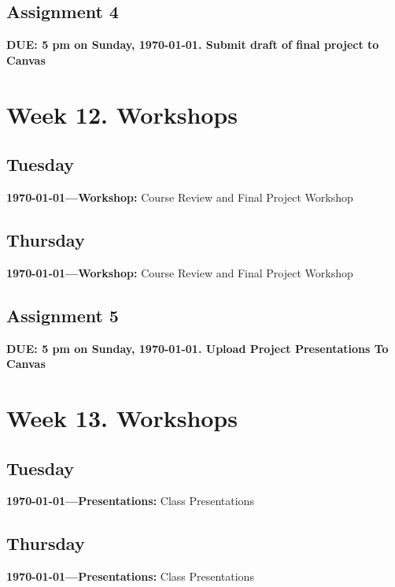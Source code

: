 \vspace{2em}
\subsection{Assignment 4} \textbf{DUE: 5 pm on Sunday, \today. Submit draft of final project to Canvas}

\AdvanceDate[2]


\vspace{2em}


\section{Week 12. Workshops }


\subsection{Tuesday} \textbf{\today---Workshop:} Course Review and Final Project Workshop
\AdvanceDate[2]

\subsection{Thursday } \textbf{\today---Workshop:} Course Review and Final Project Workshop

\AdvanceDate[3]

\vspace{2em}



\subsection{Assignment 5} \textbf{DUE: 5 pm on Sunday, \today. Upload Project Presentations To Canvas}
\AdvanceDate[2]
\vspace{2em}

\section{Week 13. Workshops }


\subsection{Tuesday} \textbf{\today---Presentations:} Class Presentations
\AdvanceDate[2]

\subsection{Thursday } \textbf{\today---Presentations:} Class Presentations

